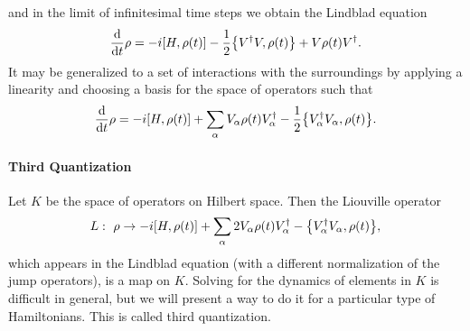 and in the limit of infinitesimal time steps we obtain the Lindblad equation
\begin{align*}
	\dv{t}\rho = -i\comm{H}{\rho(t)} - \frac{1}{2}\acomm{V\adj V}{\rho(t)} + V\rho(t)V\adj.
\end{align*}
It may be generalized to a set of interactions with the surroundings by applying a linearity and choosing a basis for the space of operators such that
\begin{align*}
	\dv{t}\rho = -i\comm{H}{\rho(t)} + \sum\limits_{\alpha}V_{\alpha}\rho(t)V_{\alpha}\adj - \frac{1}{2}\acomm{V_{\alpha}\adj V_{\alpha}}{\rho(t)}.
\end{align*}

\paragraph{Third Quantization}
Let $K$ be the space of operators on Hilbert space. Then the Liouville operator
\begin{align*}
	L:\ \rho\to -i\comm{H}{\rho(t)} + \sum\limits_{\alpha}2V_{\alpha}\rho(t)V_{\alpha}\adj - \acomm{V_{\alpha}\adj V_{\alpha}}{\rho(t)},
\end{align*}
which appears in the Lindblad equation (with a different normalization of the jump operators), is a map on $K$. Solving for the dynamics of elements in $K$ is difficult in general, but we will present a way to do it for a particular type of Hamiltonians. This is called third quantization.

